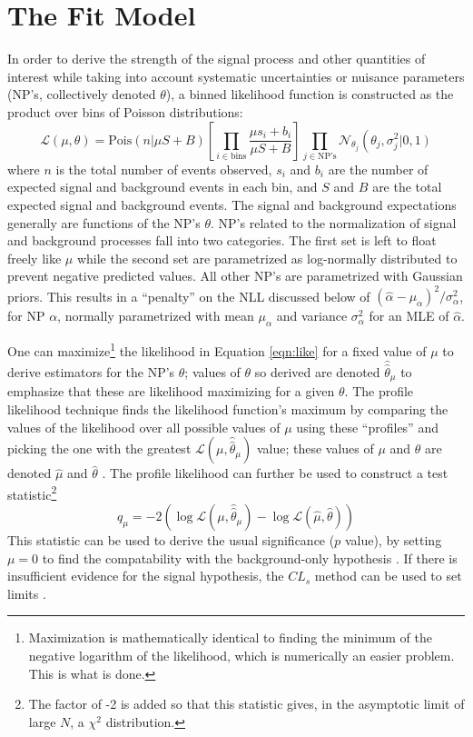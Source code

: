 \section{The Fit Model}
In order to derive the strength of the signal process \ZH and other quantities of interest while taking into account systematic uncertainties or nuisance parameters (NP's, collectively denoted $\theta$), a binned likelihood function is constructed as the product over bins of Poisson distributions:
\begin{equation}
\label{eqn:like}
\mathcal{L}\left(\mu,\theta\right)=\text{Pois}\left(n\right.\left|\mu S+B\right)\left[\prod_{i\in\text{bins}}\frac{\mu s_i+b_i}{\mu S+B}\right]\prod_{j\in\text{NP's}}\mathcal{N}_{\theta_j}\left(\theta_j,\sigma_j^2\right.\left|0,1\right)
\end{equation}
where $n$ is the total number of events observed, $s_i$ and $b_i$ are the number of expected signal and background events in each bin, and $S$ and $B$ are the total expected signal and background events.  The signal and background expectations generally are functions of the  NP's $\theta$.  NP's related to the normalization of signal and background processes fall into two categories.  The first set is left to float freely like $\mu$ while the second set are parametrized as log-normally distributed to prevent negative predicted values.  All other NP's are parametrized with Gaussian priors.  This results in a ``penalty'' on the NLL discussed below of $\left(\hat{\alpha}-\mu_{\alpha}\right)^2/\sigma_{\alpha}^2$, for NP $\alpha$, normally parametrized with mean $\mu_{\alpha}$ and variance $\sigma_{\alpha}^2$ for an MLE of $\hat{\alpha}$.

One can maximize\footnote{Maximization is mathematically identical to finding the minimum of the negative logarithm of the likelihood, which is numerically an easier problem.  This is what is done.} the likelihood in Equation \ref{eqn:like} for a fixed value of $\mu$ to derive estimators for the NP's $\theta$; values of $\theta$ so derived are denoted $\hat{\hat{\theta}}_{\mu}$ to emphasize that these are likelihood maximizing for a given $\theta$.  The profile likelihood technique finds the likelihood function's maximum by comparing the values of the likelihood over all possible values of $\mu$ using these ``profiles'' and picking the one with the greatest $\mathcal{L}\left(\mu,\hat{\hat{\theta}}_{\mu}\right)$ value; these values of $\mu$ and $\theta$ are denoted $\hat{\mu}$ and $\hat{\theta}$ .  The profile likelihood can further be used to construct a test statistic\footnote{The factor of -2 is added so that this statistic gives, in the asymptotic limit of large $N$, a $\chi^2$ distribution.}
\begin{equation}
\label{eqn:teststat}
q_{\mu}=-2\left(\log\mathcal{L}\left(\mu,\hat{\hat{\theta}}_{\mu}\right)-\log\mathcal{L}\left(\hat{\mu},\hat{\theta}\right)\right)
\end{equation}
This statistic can be used to derive the usual significance ($p$ value), by setting $\mu=0$ to find the compatability with the background-only hypothesis \cite{asimov}.  If there is insufficient evidence for the signal hypothesis, the $CL_s$ method can be used to set limits \cite{cls_read}.

